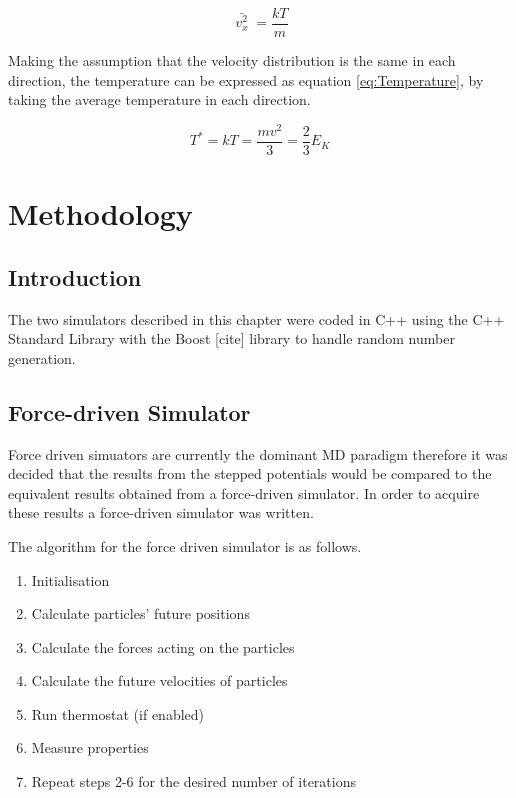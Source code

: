 \documentclass[12pt]{UoAthesis}
\begin{document}
\begin{equation}
  \label{eq:MSV}
  \bar{\;v_x^2\;} = \frac{kT}{m}
\end{equation}

Making the assumption that the velocity distribution is the same in
each direction, the temperature can be expressed as equation
\eqref{eq:Temperature}, by taking the average temperature in each
direction. 

\begin{equation}
\label{eq:Temperature}
  T^* = kT = \frac{mv^2}{3} = \frac{2}{3}E_K
\end{equation}
\newpage

\chapter{Methodology} 
\section{Introduction} 

The two simulators described in this chapter were coded in C++ using
the C++ Standard Library with the Boost [cite] library to handle
random number generation.

\section{Force-driven Simulator} 
Force driven simuators are currently the
dominant MD paradigm therefore it was decided that the results from
the stepped potentials would be compared to the equivalent results
obtained from a force-driven simulator. In order to acquire these
results a force-driven simulator was written.

The algorithm for the force driven simulator is as follows. 
\begin{flushleft}
  \begin{enumerate} 
  \item Initialisation 
  \item Calculate particles' future positions 
  \item Calculate the forces acting on the particles 
  \item Calculate the future velocities of particles 
  \item Run thermostat (if enabled) 
  \item Measure properties 
  \item Repeat steps 2-6 for the desired number of iterations
  \end{enumerate} 
\end{flushleft}
\end{document}
